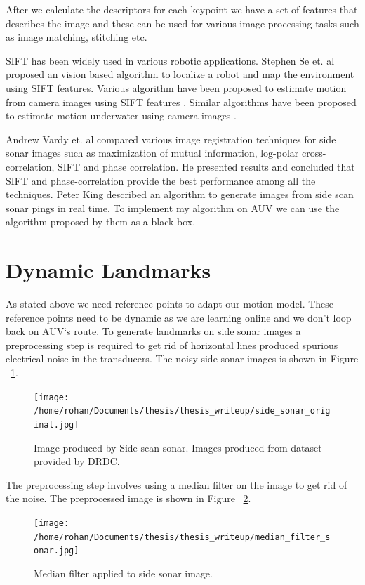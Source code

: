 \documentclass[12pt]{dalcsthesis}
\begin{document}
After we calculate the descriptors for each keypoint we have a set of features that describes the image and these can be used for various image processing tasks such as image matching, stitching etc. 

SIFT has  been widely used in various robotic applications. Stephen Se et. al \cite{se2001vision} proposed an vision based algorithm to localize a robot and map the environment using SIFT features. Various algorithm have been proposed to estimate motion from camera images using SIFT features \cite{barfoot2005online} \cite{scaramuzza2008appearance}. Similar algorithms have been proposed to estimate motion underwater using camera images \cite{Silva}.

Andrew Vardy et. al \cite{vandrish2011side} compared various image registration techniques for side sonar images such as  maximization of mutual information, log-polar cross-correlation, SIFT and phase correlation. He presented results and concluded that SIFT and phase-correlation provide the best performance among all the techniques. Peter King \cite{king2012real} described an algorithm to generate images from side scan sonar pings in real time. To implement my algorithm on AUV we can use the algorithm proposed by them as a black box.


\section{Dynamic Landmarks}
\label{ch-: dynamic landmarks}

As stated above we need reference points to adapt our motion model. These reference points need to be dynamic as we are learning online and we don't loop back on AUV`s route. To generate landmarks on side sonar images a preprocessing step is required to get rid of horizontal lines produced spurious electrical noise in the transducers. The noisy side sonar images is shown in Figure ~\ref{fig- side sonar image original}.

\begin{figure}
  \centering
     {\texttt{[image: /home/rohan/Documents/thesis/thesis\_writeup/side\_sonar\_original.jpg]}}
  \caption{\label{fig- side sonar image original} Image produced by Side scan sonar. Images produced from dataset provided by DRDC.}
\end{figure}


The preprocessing step involves using a median filter on the image to get rid of the noise. The preprocessed image is shown in Figure ~\ref{fig- side sonar median}.
\begin{figure}
  \centering
     {\texttt{[image: /home/rohan/Documents/thesis/thesis\_writeup/median\_filter\_sonar.jpg]}}
  \caption{\label{fig- side sonar median} Median filter applied to side sonar image.}
\end{figure}
\end{document}
